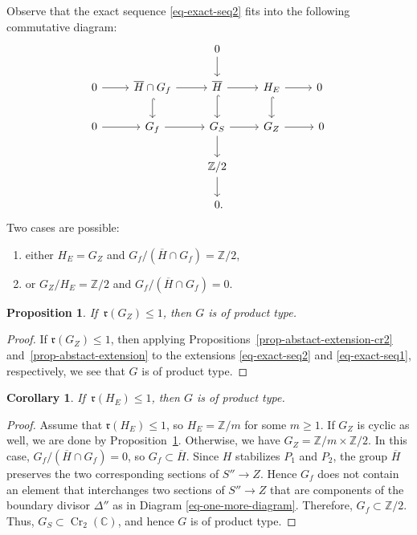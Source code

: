 \documentclass[11pt]{amsart}
\numberwithin{equation}{section}
\newtheorem{proposition}[thm]{Proposition}
\newtheorem{corollary}[thm]{Corollary}
\theoremstyle{definition}
\theoremstyle{remark}
\DeclareMathOperator{\Cr}{Cr}
\begin{document}
Observe that the exact sequence \eqref{eq-exact-seq2} fits into the following commutative diagram:
\begin{equation}
\begin{tikzcd}
& & 0 \ar[d]  & & \ \\
0 \ar[r] & {\overline H}\cap G_f \ar[r] \ar[d, hook] & {\overline H} \ar[d, hook] \ar[r] & H_E \ar[d, hook] \ar[r] & 0 \ \\
0 \ar[r] & G_f \ar[r] & G_S \ar[r] \ar[d] & G_Z \ar[r] & 0\\
& & \mathbb{Z}/2 \ar[d] & & \ \\
& & 0\rlap{.} & & \ 
\end{tikzcd}
\end{equation}
Two cases are possible: 
\begin{enumerate}
\item
either $H_E=G_Z$ and $G_f/({\overline H}\cap G_f)=\mathbb{Z}/2$,
\item
or $G_Z/H_E=\mathbb{Z}/2$ and $G_f/({\overline H}\cap G_f)=0$.
\end{enumerate}

\begin{proposition}
\label{prop-rank-GZ-1}
If\, $\mathfrak{r}(G_Z)\leq 1$, then $G$ is of product type. 
\end{proposition}

\begin{proof}
If $\mathfrak{r}(G_Z)\leq 1$, then applying Propositions~\ref{prop-abstact-extension-cr2} and~\ref{prop-abstact-extension} to the extensions \eqref{eq-exact-seq2} and \eqref{eq-exact-seq1}, respectively, we see that $G$ is of product type. 
\end{proof}

\begin{corollary}
\label{prop-rank-HE}
If\, $\mathfrak{r}(H_E)\leq 1$, then $G$ is of product type. 
\end{corollary}

\begin{proof}
Assume that $\mathfrak{r}(H_E)\leq 1$, so $H_E=\mathbb{Z}/m$ for some $m\geq 1$. If $G_Z$ is cyclic as well, we are done by Proposition~\ref{prop-rank-GZ-1}.  
Otherwise, we have $G_Z=\mathbb{Z}/m \times \mathbb{Z}/2$. In this case, $G_f/(\overline H\cap G_f)=0$, so $G_f\subset\overline H$. Since $H$ stabilizes $P_1$ and $P_2$, the group $\overline H$ preserves the two corresponding sections of $S''\to Z$.
Hence $G_f$ does not contain an element that interchanges two sections of $S''\to Z$ that are components of the boundary divisor $\Delta''$ as in Diagram \eqref{eq-one-more-diagram}. Therefore, $G_f\subset \mathbb{Z}/2$. Thus, $G_S\subset \Cr_2(\mathbb{C})$, and hence $G$ is of product type. 
\end{proof}
\end{document}
